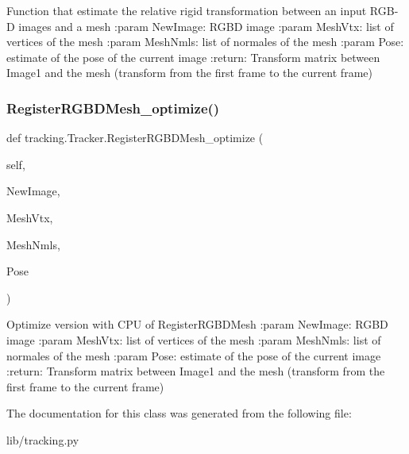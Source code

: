 \begin{DoxyVerb}Function that estimate the relative rigid transformation between an input RGB-D images and a mesh
:param NewImage: RGBD image
:param MeshVtx: list of vertices of the mesh
:param MeshNmls: list of normales of the mesh
:param Pose:  estimate of the pose of the current image
:return: Transform matrix between Image1 and the mesh (transform from the first frame to the current frame)
\end{DoxyVerb}
 \mbox{\label{classtracking_1_1_tracker_a435754ca561996d43da1bd5d91b9ad36}} 
\subsubsection{Register\+R\+G\+B\+D\+Mesh\+\_\+optimize()}
{\footnotesize\ttfamily def tracking.\+Tracker.\+Register\+R\+G\+B\+D\+Mesh\+\_\+optimize (\begin{DoxyParamCaption}\item[{}]{self,  }\item[{}]{New\+Image,  }\item[{}]{Mesh\+Vtx,  }\item[{}]{Mesh\+Nmls,  }\item[{}]{Pose }\end{DoxyParamCaption})}

\begin{DoxyVerb}Optimize version with CPU  of RegisterRGBDMesh
:param NewImage: RGBD image
:param MeshVtx: list of vertices of the mesh
:param MeshNmls: list of normales of the mesh
:param Pose:  estimate of the pose of the current image
:return: Transform matrix between Image1 and the mesh (transform from the first frame to the current frame)
\end{DoxyVerb}
 

The documentation for this class was generated from the following file\+:\begin{DoxyCompactItemize}
\item 
lib/tracking.\+py\end{DoxyCompactItemize}
